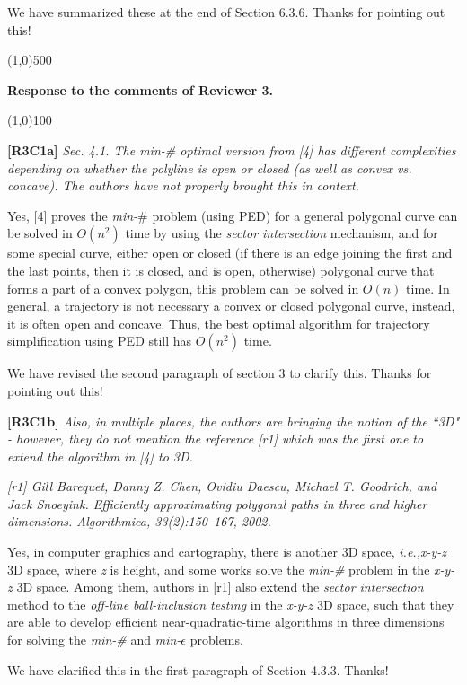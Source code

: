 \documentclass{letter}
\newcommand{\ie}{\emph{i.e.,}\xspace}
\begin{document}
We have summarized these at the end of Section 6.3.6. Thanks for pointing out this!


\line(1,0){500}

\textbf{Response to the comments of Reviewer 3.}

\line(1,0){100}

\textbf{[R3C1a]} \emph{
Sec. 4.1. The min-\# optimal version from [4] has different complexities depending on whether the polyline is open or closed (as well as convex vs. concave). The authors have not properly brought this in context.}

Yes, [4] proves the \emph{min-$\#$} problem (using PED) for a general polygonal curve can be solved in $O(n^2)$ time by using the \textit{sector intersection} mechanism, and for some special curve, either open or closed (if there is an edge joining the first and the last points, then it is closed, and is open, otherwise) polygonal curve that forms  a part of a convex polygon, this problem can be solved in $O(n)$ time. In general, a trajectory is not necessary a convex or closed polygonal curve, instead, it is often open and concave. Thus, the best optimal algorithm for trajectory simplification using PED still has $O(n^2)$ time.

We have revised the second paragraph of section 3 to clarify this. Thanks for pointing out this!

\textbf{[R3C1b]} \emph{Also, in multiple places, the authors are bringing the notion of the ``3D" - however, they do not mention the reference [r1] which was the first one to extend the algorithm in [4] to 3D. }

\emph{[r1] Gill Barequet, Danny Z. Chen, Ovidiu Daescu, Michael T. Goodrich, and Jack Snoeyink. Efficiently approximating polygonal paths in three and higher dimensions. Algorithmica, 33(2):150--167, 2002.}

Yes, in computer graphics and cartography, there is another 3D space, \ie \emph{x-y-z} 3D space, where {\em z} is height, and some works solve the \emph{min-\#} problem in the \emph{x-y-z} 3D space. Among them, authors in [r1] also extend the \textit{sector intersection} method to the \textit{off-line ball-inclusion testing} in the \emph{x-y-z} 3D space, such that they are able to develop efficient near-quadratic-time algorithms in three dimensions for solving the \emph{min-\#} and \emph{min-$\epsilon$} problems. %

We have clarified this in the first paragraph of Section 4.3.3. Thanks!
\end{document}
